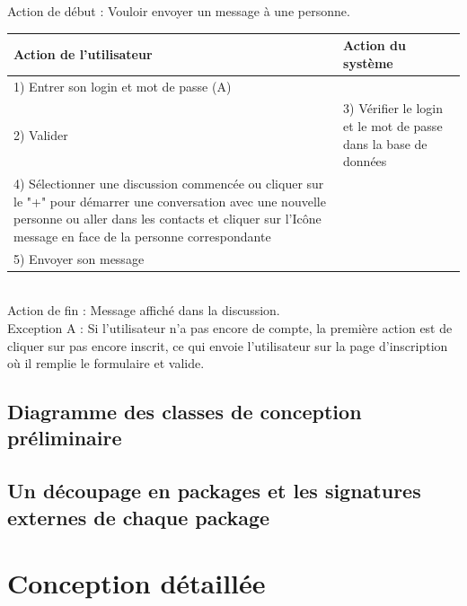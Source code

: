 \documentclass[a4paper,12pt]{article}
\begin{document}
Action de début : Vouloir envoyer un message à une personne. \\

\begin{tabular}{|p{7cm}|p{7cm}|}
\hline 
Action de l'utilisateur & Action du système\tabularnewline
\hline 
\hline 
1) Entrer son login et mot de passe (A)  & \tabularnewline
\hline 
2) Valider  & 3) Vérifier le login et le mot de passe dans la base de données\tabularnewline
\hline 
4) Sélectionner une discussion commencée ou cliquer sur le "+" pour
démarrer une conversation avec une nouvelle personne ou aller dans les contacts et cliquer sur l’Icône message en face de la personne correspondante & \tabularnewline
\hline 
5) Envoyer son message  & \tabularnewline
\hline 
\end{tabular}

~\\

Action de fin  : Message affiché dans la discussion. \\

Exception A : Si l'utilisateur n'a pas encore de compte, la première action est de cliquer sur pas encore inscrit, ce qui envoie l'utilisateur sur la page d'inscription où il remplie le formulaire et valide. 



\subsection{Diagramme des classes de conception préliminaire}

\subsection{Un découpage en packages et les signatures externes de chaque package}

\section{Conception détaillée}


\end{document}
